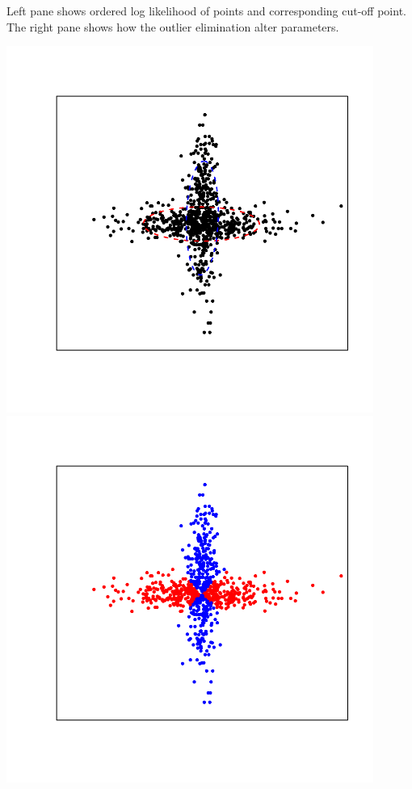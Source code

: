 \documentclass[landscape,footrule]{foils}
\begin{document}
\vspace*{-2cm}
Left pane shows ordered log likelihood of points and corresponding cut-off point. The right pane shows how the outlier elimination alter parameters. 



\begin{center}
\includegraphics[width=12cm]{ambiguous-hc-1}\hspace*{-2cm}
\includegraphics[width=12cm]{ambiguous-hc-2}
\end{center}
\vspace*{-2cm}
\end{document}
